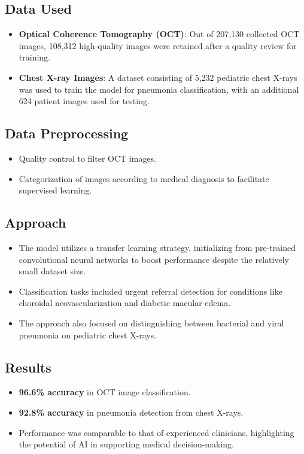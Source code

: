 \subsection*{Data Used}
\begin{itemize}
    \item \textbf{Optical Coherence Tomography (OCT)}: Out of 207,130 collected OCT images, 108,312 high-quality images were retained after a quality review for training.
    \item \textbf{Chest X-ray Images}: A dataset consisting of 5,232 pediatric chest X-rays was used to train the model for pneumonia classification, with an additional 624 patient images used for testing.
\end{itemize}

\subsection*{Data Preprocessing}
\begin{itemize}
    \item Quality control to filter OCT images.
    \item Categorization of images according to medical diagnosis to facilitate supervised learning.
\end{itemize}

\subsection*{Approach}
\begin{itemize}
    \item The model utilizes a transfer learning strategy, initializing from pre-trained convolutional neural networks to boost performance despite the relatively small dataset size.
    \item Classification tasks included urgent referral detection for conditions like choroidal neovascularization and diabetic macular edema.
    \item The approach also focused on distinguishing between bacterial and viral pneumonia on pediatric chest X-rays.
\end{itemize}

\subsection*{Results}
\begin{itemize}
    \item \textbf{96.6\% accuracy} in OCT image classification.
    \item \textbf{92.8\% accuracy} in pneumonia detection from chest X-rays.
    \item Performance was comparable to that of experienced clinicians, highlighting the potential of AI in supporting medical decision-making.
\end{itemize}

